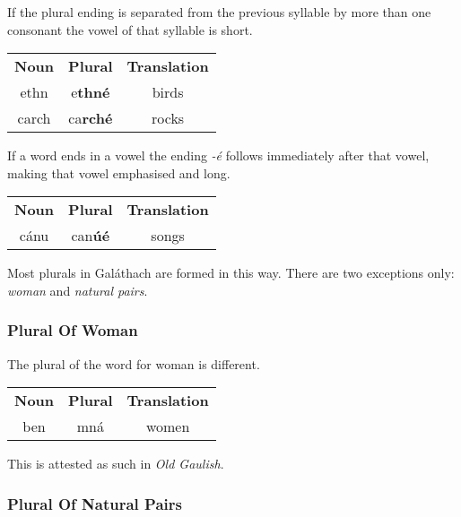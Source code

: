 If the plural ending is separated from the previous syllable by more than one consonant the vowel of that syllable is short.
\begin{table}[H]
\centering
\begin{tabular}{ccc}
  \toprule
  \textbf{Noun} & \textbf{Plural} & \textbf{Translation}\\
  \cmidrule(lr){1-1}\cmidrule(lr){2-2}\cmidrule(lr){3-3}
  ethn & e\textbf{thn\'{e}} & birds\\
  carch & ca\textbf{rch\'{e}} & rocks\\
  \bottomrule
\end{tabular}
\label{example_plural_multiple_consonants}
\end{table}

If a word ends in a vowel the ending \textit{-\'{e}} follows immediately after that vowel, making that vowel emphasised and long.
\begin{table}[H]
\centering
\begin{tabular}{ccc}
  \toprule
  \textbf{Noun} & \textbf{Plural} & \textbf{Translation}\\
  \cmidrule(lr){1-1}\cmidrule(lr){2-2}\cmidrule(lr){3-3}
  c\'{a}nu & can\textbf{\'{u}\'{e}} & songs\\
  \bottomrule
\end{tabular}
\label{example_plural_ends_in_vowel}
\end{table}

Most plurals in Gal\'{a}thach are formed in this way. There are two exceptions only: \textit{woman} and \textit{natural pairs}.

\subsubsection{Plural Of Woman}

The plural of the word for woman is different.
\begin{table}[H]
\centering
\begin{tabular}{ccc}
  \toprule
  \textbf{Noun} & \textbf{Plural} & \textbf{Translation}\\
  \cmidrule(lr){1-1}\cmidrule(lr){2-2}\cmidrule(lr){3-3}
  ben & mn\'{a} & women\\
  \bottomrule
\end{tabular}
\label{example_plural_of_woman}
\end{table}

This is attested as such in \textit{Old Gaulish}.

\subsubsection{Plural Of Natural Pairs}

